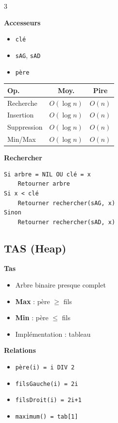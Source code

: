 \documentclass[10pt,a4paper,landscape]{article}
\begin{document}
\begin{multicols}{3}
\begin{algobox}
\textbf{Accesseurs}
\begin{itemize}
\item \texttt{clé}
\item \texttt{sAG}, \texttt{sAD}
\item \texttt{père}
\end{itemize}
\end{algobox}

\begin{complexbox}
\begin{tabular}{lcc}
\textbf{Op.} & \textbf{Moy.} & \textbf{Pire} \\
\hline
Recherche & $O(\log n)$ & $O(n)$ \\
Insertion & $O(\log n)$ & $O(n)$ \\
Suppression & $O(\log n)$ & $O(n)$ \\
Min/Max & $O(\log n)$ & $O(n)$ \\
\end{tabular}
\end{complexbox}

\begin{algobox}
\small
\textbf{Rechercher}
\begin{verbatim}
Si arbre = NIL OU clé = x
    Retourner arbre
Si x < clé
    Retourner rechercher(sAG, x)
Sinon
    Retourner rechercher(sAD, x)
\end{verbatim}
\end{algobox}

\subsection*{TAS (Heap)}

\begin{defbox}
\textbf{Tas}
\begin{itemize}
\item Arbre binaire presque complet
\item \textbf{Max} : père $\geq$ fils
\item \textbf{Min} : père $\leq$ fils
\item Implémentation : tableau
\end{itemize}
\end{defbox}

\begin{algobox}
\textbf{Relations}
\begin{itemize}
\item \texttt{père(i) = i DIV 2}
\item \texttt{filsGauche(i) = 2i}
\item \texttt{filsDroit(i) = 2i+1}
\item \texttt{maximum() = tab[1]}
\end{itemize}
\end{algobox}


\end{multicols}
\end{document}
